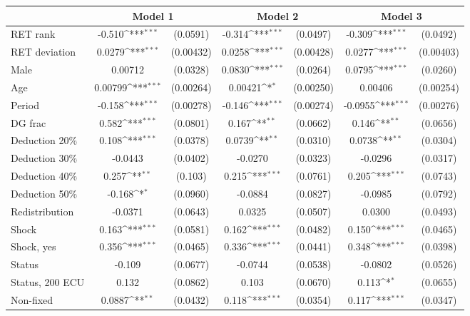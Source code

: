 {
\def\sym#1{\ifmmode^{#1}\else\(^{#1}\)\fi}
\begin{tabular}{l*{3}{cc}}
\hline\hline
                &\multicolumn{2}{c}{Model 1} &\multicolumn{2}{c}{Model 2} &\multicolumn{2}{c}{Model 3} \\
\hline
RET rank        &   -0.510\sym{***}& (0.0591)&   -0.314\sym{***}& (0.0497)&   -0.309\sym{***}& (0.0492)\\
RET deviation   &   0.0279\sym{***}&(0.00432)&   0.0258\sym{***}&(0.00428)&   0.0277\sym{***}&(0.00403)\\
Male            &  0.00712         & (0.0328)&   0.0830\sym{***}& (0.0264)&   0.0795\sym{***}& (0.0260)\\
Age             &  0.00799\sym{***}&(0.00264)&  0.00421\sym{*}  &(0.00250)&  0.00406         &(0.00254)\\
Period          &   -0.158\sym{***}&(0.00278)&   -0.146\sym{***}&(0.00274)&  -0.0955\sym{***}&(0.00276)\\
DG frac         &    0.582\sym{***}& (0.0801)&    0.167\sym{**} & (0.0662)&    0.146\sym{**} & (0.0656)\\
Deduction 20\%  &    0.108\sym{***}& (0.0378)&   0.0739\sym{**} & (0.0310)&   0.0738\sym{**} & (0.0304)\\
Deduction 30\%  &  -0.0443         & (0.0402)&  -0.0270         & (0.0323)&  -0.0296         & (0.0317)\\
Deduction 40\%  &    0.257\sym{**} &  (0.103)&    0.215\sym{***}& (0.0761)&    0.205\sym{***}& (0.0743)\\
Deduction 50\%  &   -0.168\sym{*}  & (0.0960)&  -0.0884         & (0.0827)&  -0.0985         & (0.0792)\\
Redistribution  &  -0.0371         & (0.0643)&   0.0325         & (0.0507)&   0.0300         & (0.0493)\\
Shock           &    0.163\sym{***}& (0.0581)&    0.162\sym{***}& (0.0482)&    0.150\sym{***}& (0.0465)\\
Shock, yes      &    0.356\sym{***}& (0.0465)&    0.336\sym{***}& (0.0441)&    0.348\sym{***}& (0.0398)\\
Status          &   -0.109         & (0.0677)&  -0.0744         & (0.0538)&  -0.0802         & (0.0526)\\
Status, 200 ECU &    0.132         & (0.0862)&    0.103         & (0.0670)&    0.113\sym{*}  & (0.0655)\\
Non-fixed       &   0.0887\sym{**} & (0.0432)&    0.118\sym{***}& (0.0354)&    0.117\sym{***}& (0.0347)\\

\end{tabular}}
